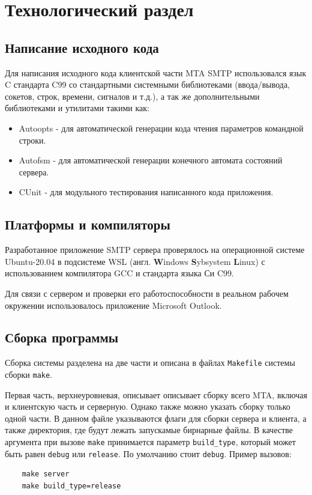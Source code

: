 \documentclass[a4paper,12pt]{report}
\begin{document}
\chapter{Технологический раздел}


\section{Написание исходного кода}

Для написания исходного кода клиентской части MTA SMTP использовался язык C стандарта C99 со стандартными системными библиотеками (ввода/вывода, сокетов, строк, времени, сигналов и т.д.), а так же дополнительными библиотеками и утилитами такими как:
\begin{itemize}
    \item Autoopts - для автоматической генерации кода чтения параметров командной строки.
    \item Autofsm - для автоматической генерации конечного автомата состояний сервера.
    \item CUnit - для модульного тестирования написанного кода приложения.
\end{itemize}


\section{Платформы и компиляторы}

Разработанное приложение SMTP сервера проверялось на операционной системе Ubuntu-20.04 в подсистеме WSL (англ. \textbf{W}indows \textbf{S}ybsystem \textbf{L}inux) с использованием компилятора GCC и стандарта языка Си C99.

Для связи с сервером и проверки его работоспособности в реальном рабочем окружении использовалось приложение Microsoft Outlook.


\section{Сборка программы}

Сборка системы разделена на две части и описана в файлах \texttt{Makefile} системы сборки \texttt{make}.

Первая часть, верхнеуровневая, описывает описывает сборку всего MTA, включая и клиентскую часть и серверную. Однако также можно указать сборку только одной части. В данном файле указываются флаги для сборки сервера и клиента, а также директория, где будут лежать запускамые бирнарные файлы. В качестве аргумента при вызове \texttt{make} принимается параметр \texttt{build\_type}, который может быть равен \texttt{debug} или \texttt{release}. По умолчанию стоит \texttt{debug}. Пример вызовов:
\begin{verbatim}
    make server
    make build_type=release
\end{verbatim}
\end{document}

